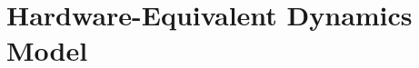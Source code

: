 \documentclass[crop=false,float=true,class=scrreprt]{standalone}
\providecommand{\main}{../..}
\begin{document}
\startcontents[hwePlantDynamicsModel]





\chapter{Hardware-Equivalent Dynamics Model}
\label{SEC:hwePlantDynamicsModel}



%







\stopcontents[hwePlantDynamicsModel]
\end{document}

